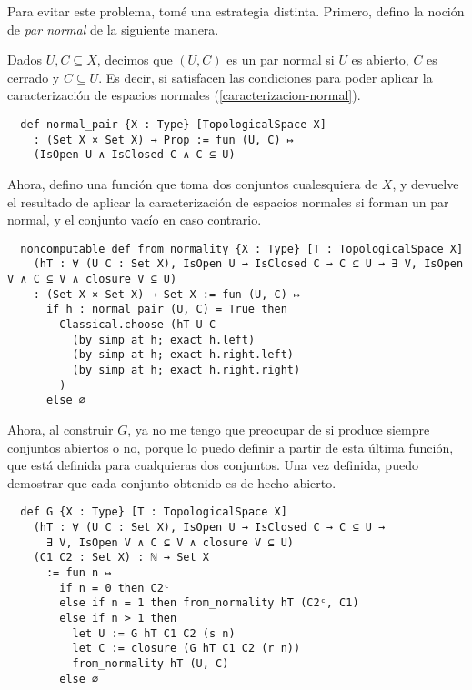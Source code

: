 Para evitar este problema, tomé una estrategia distinta. Primero, defino la noción de \textit{par normal} de la siguiente manera.

\begin{definition}
  Dados $U, C \subseteq X$, decimos que $(U, C)$ es un \textnormal{par normal} si $U$ es abierto, $C$ es cerrado y $C \subseteq U$. Es decir, si satisfacen las condiciones para poder aplicar la caracterización de espacios normales (\ref{caracterizacion-normal}).
\end{definition}

\begin{lstlisting}
  def normal_pair {X : Type} [TopologicalSpace X]
    : (Set X × Set X) → Prop := fun (U, C) ↦
    (IsOpen U ∧ IsClosed C ∧ C ⊆ U)
\end{lstlisting}

Ahora, defino una función  que toma dos conjuntos cualesquiera de $X$, y devuelve el resultado de aplicar la caracterización de espacios normales si forman un par normal, y el conjunto vacío en caso contrario.

\begin{lstlisting}
  noncomputable def from_normality {X : Type} [T : TopologicalSpace X]
    (hT : ∀ (U C : Set X), IsOpen U → IsClosed C → C ⊆ U → ∃ V, IsOpen V ∧ C ⊆ V ∧ closure V ⊆ U)
    : (Set X × Set X) → Set X := fun (U, C) ↦
      if h : normal_pair (U, C) = True then
        Classical.choose (hT U C
          (by simp at h; exact h.left)
          (by simp at h; exact h.right.left)
          (by simp at h; exact h.right.right)
        )
      else ∅
\end{lstlisting}

Ahora, al construir $G$, ya no me tengo que preocupar de si produce siempre conjuntos abiertos o no, porque lo puedo definir a partir de esta última función, que está definida para cualquieras dos conjuntos. Una vez definida, puedo demostrar que cada conjunto obtenido es de hecho abierto.

\begin{lstlisting}
  def G {X : Type} [T : TopologicalSpace X]
    (hT : ∀ (U C : Set X), IsOpen U → IsClosed C → C ⊆ U →
      ∃ V, IsOpen V ∧ C ⊆ V ∧ closure V ⊆ U)
    (C1 C2 : Set X) : ℕ → Set X
      := fun n ↦
        if n = 0 then C2ᶜ
        else if n = 1 then from_normality hT (C2ᶜ, C1)
        else if n > 1 then
          let U := G hT C1 C2 (s n)
          let C := closure (G hT C1 C2 (r n))
          from_normality hT (U, C)
        else ∅
\end{lstlisting}

